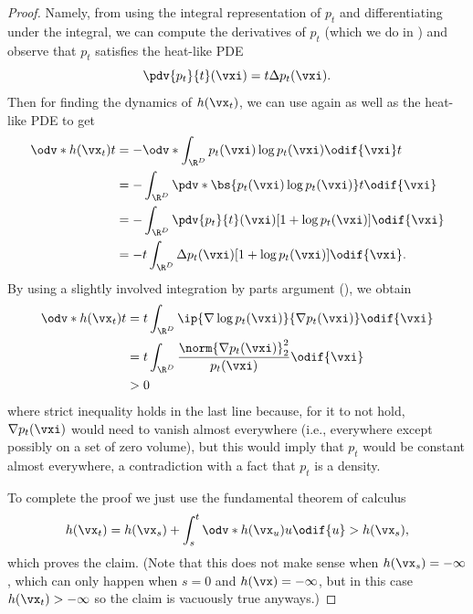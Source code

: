 \documentclass[../../book-main.tex]{subfiles}
\begin{document}
\begin{proof}
    Namely, from using the integral representation of \(p_{t}\) and
    differentiating under the integral, we can compute the
    derivatives of \(p_{t}\) (which we do in
    ) and observe that \(p_{t}\) satisfies
    the heat-like PDE
    \begin{equation}
        \pdv{p_{t}}{t}(\vxi) = t\Delta p_{t}(\vxi).
    \end{equation}
    Then for finding the dynamics of \(h(\vx_{t})\), we can use
     again as well as the heat-like PDE to get
    \begin{align}
        \odv*{h(\vx_{t})}{t}
        &= -\odv*{\int_{\R^{D}}p_{t}(\vxi)\log p_{t}(\vxi)\odif{\vxi}}{t} \\
        &= -\int_{\R^{D}}\pdv*{\bs{p_{t}(\vxi)\log
        p_{t}(\vxi)}}{t}\odif{\vxi} \\
        &= -\int_{\R^{D}}\pdv{p_{t}}{t}(\vxi)[1 + \log
        p_{t}(\vxi)]\odif{\vxi} \\
        &= -t\int_{\R^{D}}\Delta p_{t}(\vxi)[1 + \log p_{t}(\vxi)]\odif{\vxi}.
    \end{align}
    By using a slightly involved integration by parts argument
    (), we obtain
    \begin{align}
        \odv*{h(\vx_{t})}{t}
        &= t\int_{\R^{D}}\ip{\nabla \log p_{t}(\vxi)}{\nabla
        p_{t}(\vxi)}\odif{\vxi} \\
        &= t\int_{\R^{D}}\frac{\norm{\nabla
        p_{t}(\vxi)}_{2}^{2}}{p_{t}(\vxi)}\odif{\vxi} \\
        &> 0
    \end{align}
    where strict inequality holds in the last line because, for it to
    not hold, \(\nabla p_{t}(\vxi)\) would need to vanish almost
    everywhere (i.e., everywhere except possibly on a set of zero
    volume), but this would imply that \(p_{t}\) would be constant
    almost everywhere, a contradiction with a fact that \(p_{t}\) is a density.

    To complete the proof we just use the fundamental theorem of calculus
    \begin{equation}
        h(\vx_{t}) = h(\vx_{s}) +
        \int_{s}^{t}\odv*{h(\vx_{u})}{u}\odif{u} > h(\vx_{s}),
    \end{equation}
    which proves the claim. (Note that this does not make sense when
        \(h(\vx_{s}) = -\infty\), which can only happen when \(s = 0\)
        and \(h(\vx) = -\infty\), but in this case \(h(\vx_{t}) >
    -\infty\) so the claim is vacuously true anyways.)
\end{proof}
\end{document}

